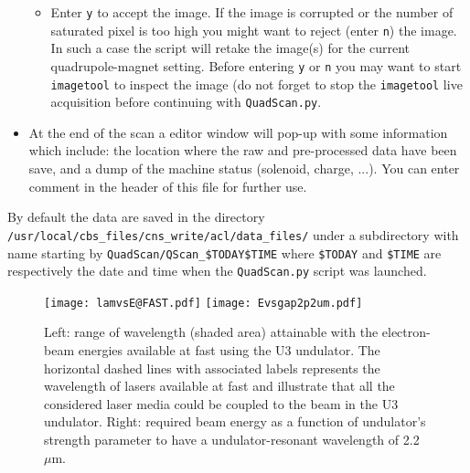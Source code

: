 \documentclass[notitlepage,twocolumn,nofootinbib,showpacs,preprintnumbers,superscriptaddress,amsmath,amssymb]{revtex4-1}
\begin{document}
\begin{itemize}
\begin{itemize}
\item Enter {\tt y} to accept the image. If the image is corrupted or the number of saturated pixel is too high you might want to reject (enter {\tt n}) the image. In such a case the script will retake the image(s) for the current quadrupole-magnet setting. Before entering {\tt y} or {\tt n} you may want to start {\tt imagetool} to inspect the image (do not forget to stop the {\tt imagetool} live acquisition before continuing with {\tt QuadScan.py}.
\end{itemize}
\item At the end of the scan a editor window will pop-up with some information which include: the location where the raw and pre-processed data have been save, and a dump of the machine status (solenoid, charge, ...). You can enter comment in the header of this file for further use. \end{itemize}
By default the data are saved in the directory {\tt /usr/local/cbs\_files/cns\_write/acl/data\_files/} under a subdirectory with name starting by {\tt QuadScan/QScan\_\$TODAY\$TIME} where {\tt \$TODAY} and {\tt \$TIME} are respectively the date and time when the {\tt QuadScan.py} script was launched. 

%
\begin{figure}[b]
\begin{center}
 \texttt{[image: lamvsE@FAST.pdf]}
 \texttt{[image: Evsgap2p2um.pdf]}
\caption{{\sc Left:} range of wavelength (shaded area) attainable with the electron-beam energies available at {\sc fast} using the U3 undulator. The horizontal dashed lines with associated labels represents the wavelength of lasers available at {\sc fast} and illustrate that all the considered laser media could be coupled to the beam in the U3 undulator. {\sc Right:} required beam energy as a function of undulator's strength parameter to have a undulator-resonant wavelength of 2.2~$\mu$m.\label{fig:U3wave} }
\end{center}
\end{figure}

%
%
%
\begin{thebibliography}{99}
\end{thebibliography}
\end{document}
